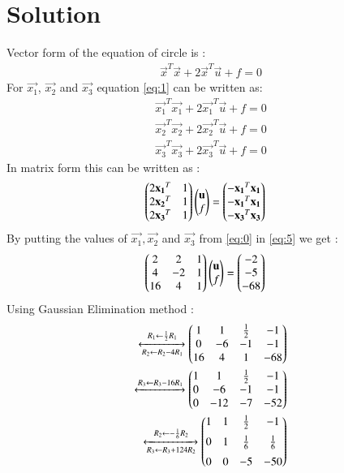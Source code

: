 \documentclass[journal,12pt,twocolumn]{IEEEtran}
\begin{document}
\section{\textbf{Solution}}
Vector form of the equation of circle is :
\begin{align}
\vec{x}^T\vec{x}+2\vec{x}^T\vec{u}+f=0\label{eq:1}
\end{align}
For $\vec{x_1}$, $\vec{x_2}$ and $\vec{x_3}$ equation \eqref{eq:1} can be written as:
\begin{align}
\vec{x_1}^T\vec{x_1}+2\vec{x_1}^T\vec{u}+f=0\\
\vec{x_2}^T\vec{x_2}+2\vec{x_2}^T\vec{u}+f=0\\
\vec{x_3}^T\vec{x_3}+2\vec{x_3}^T\vec{u}+f=0
\end{align}
In matrix form this can be written as :
\begin{align}
    \begin{pmatrix}2\mathbf{x_1}^T&1\\2\mathbf{x_2}^T&1\\2\mathbf{x_3}^T&1\end{pmatrix}\begin{pmatrix}\mathbf{u}\\f\end{pmatrix}&=\begin{pmatrix}-\mathbf{x_1}^T\mathbf{x_1}\\-\mathbf{x_1}^T\mathbf{x_1}\\-\mathbf{x_3}^T\mathbf{x_3}\end{pmatrix}\label{eq:5}
\end{align}
By putting the values of $\vec{x_1},\vec{x_2}$ and $\vec{x_3}$ from \eqref{eq:0} in \eqref{eq:5} we get :   
\begin{align}
 \begin{pmatrix}2&2&1\\4&-2&1\\16&4&1\end{pmatrix}\begin{pmatrix}\mathbf{u}\\f\end{pmatrix}&=\begin{pmatrix}-2\\-5\\-68\end{pmatrix} \label{eq:6}
\end{align}
Using Gaussian Elimination method :
\begin{align}
\xleftrightarrow[R_2 \leftarrow R_2-4R_1]{R_1 \leftarrow \frac{1}{2}R_1}\begin{pmatrix}1&1&\frac{1}{2}&-1\\0&-6&-1&-1\\16&4&1&-68\end{pmatrix}\\
\xleftrightarrow{R_3 \leftarrow R_3-16R_1}\begin{pmatrix}1&1&\frac{1}{2}&-1\\0&-6&-1&-1\\0&-12&-7&-52\end{pmatrix}\\
\xleftrightarrow[R_3 \leftarrow R_3+124R_2]{R_2 \leftarrow -\frac{1}{6}R_2}\begin{pmatrix}1&1&\frac{1}{2}&-1\\[0.2cm]0&1&\frac{1}{6}&\frac{1}{6}\\[0.2cm]0&0&-5&-50\end{pmatrix}\label{eq:9}
\end{align}
\end{document}
